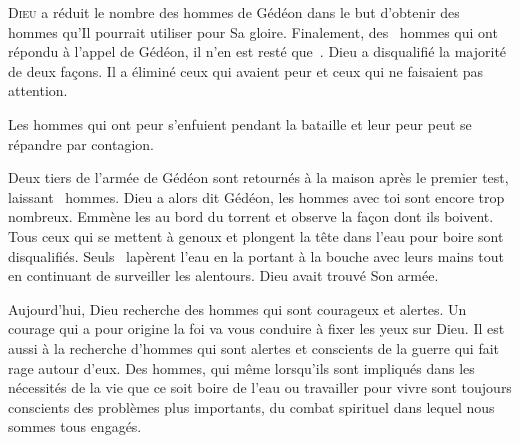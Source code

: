 \dvrule








\lettrine{D}{ieu} a réduit le nombre des hommes de Gédéon
 dans le but d'obtenir des hommes qu'Il pourrait utiliser pour Sa gloire.
 Finalement, des ~hommes qui ont répondu à l'appel de Gédéon,
 il n'en est resté que~.
 Dieu a disqualifié la majorité de deux fa\c{c}ons.
 Il a éliminé ceux qui avaient peur et ceux qui ne faisaient pas attention.

Les hommes qui ont peur s'enfuient pendant la bataille et leur peur peut
 se répandre par contagion.


Deux tiers de l'armée de Gédéon sont retournés à la maison
 après le premier test, laissant ~hommes.
 Dieu a alors dit\frcolon{}
 \Og Gédéon, les hommes avec toi sont encore trop nombreux.
 Emmène les au bord du torrent et observe la fa\c{c}on dont ils boivent.
 Tous ceux qui se mettent à genoux et plongent la tête dans l'eau pour boire
 sont disqualifiés. \Fg{}
 Seuls ~lapèrent l'eau en la portant à la bouche avec leurs mains
 tout en continuant de surveiller les alentours. Dieu avait trouvé Son armée.

Aujourd'hui, Dieu recherche des hommes qui sont courageux et alertes.
 Un courage qui a pour origine la foi va vous conduire
 à fixer les yeux sur Dieu. Il est aussi à la recherche d'hommes
 qui sont alertes et conscients de la guerre qui fait rage autour d'eux.
 Des hommes, qui même lorsqu'ils sont impliqués dans les nécessités de la vie
 \ocadr que ce soit boire de l'eau ou travailler pour vivre \fcadr{}
 sont toujours conscients des problèmes plus importants,
 du combat spirituel dans lequel nous sommes tous engagés. 

